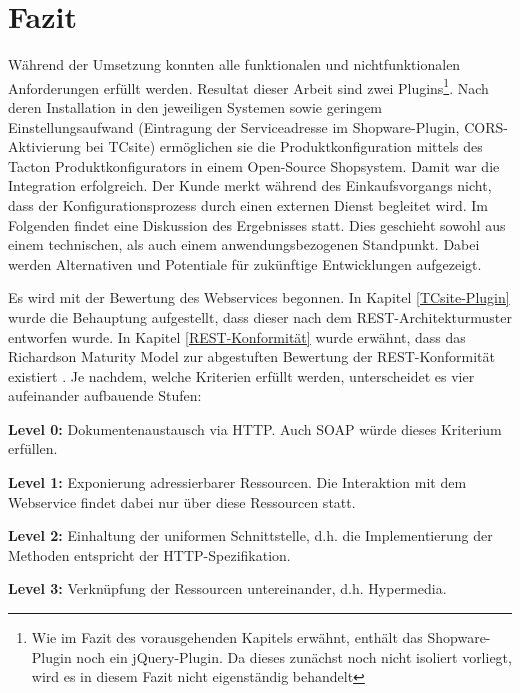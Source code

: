 \documentclass[11pt, a4paper, titlepage, listof=totoc, bibliography=totoc, index=totoc, twoside, openright, headings=normal]{scrreprt}
\begin{document}
\chapter{Fazit}
\label{Fazit}
Während der Umsetzung konnten alle funktionalen und nichtfunktionalen Anforderungen erfüllt werden. Resultat dieser Arbeit sind zwei Plugins\footnote{Wie im Fazit des vorausgehenden Kapitels erwähnt, enthält das Shopware-Plugin noch ein jQuery-Plugin. Da dieses zunächst noch nicht isoliert vorliegt, wird es in diesem Fazit nicht eigenständig behandelt}. Nach deren Installation in den jeweiligen Systemen sowie geringem Einstellungsaufwand (Eintragung der Serviceadresse im Shopware-Plugin, CORS-Aktivierung bei TCsite) ermöglichen sie die Produktkonfiguration mittels des Tacton Produktkonfigurators in einem Open-Source Shopsystem. Damit war die Integration erfolgreich. Der Kunde merkt während des Einkaufsvorgangs nicht, dass der Konfigurationsprozess durch einen externen Dienst begleitet wird. Im Folgenden findet eine Diskussion des Ergebnisses statt. Dies geschieht sowohl aus einem technischen, als auch einem anwendungsbezogenen Standpunkt. Dabei werden Alternativen und Potentiale für zukünftige Entwicklungen aufgezeigt.

Es wird mit der Bewertung des Webservices begonnen. In Kapitel \ref{TCsite-Plugin} wurde die Behauptung aufgestellt, dass dieser nach dem REST-Architekturmuster entworfen wurde. In Kapitel \ref{REST-Konformität} wurde erwähnt, dass das \glqq Richardson Maturity Model\grqq{} zur abgestuften Bewertung der REST-Konformität existiert \citep{wilde11}. Je nachdem, welche Kriterien erfüllt werden, unterscheidet es vier aufeinander aufbauende Stufen:
\begin{compactitem}
\item\textbf{Level 0:} Dokumentenaustausch via HTTP. Auch SOAP würde dieses Kriterium erfüllen.
\item\textbf{Level 1:} Exponierung adressierbarer Ressourcen. Die Interaktion mit dem Webservice findet dabei nur über diese Ressourcen statt.
\item\textbf{Level 2:} Einhaltung der uniformen Schnittstelle, d.h. die Implementierung der Methoden entspricht der HTTP-Spezifikation.
\item\textbf{Level 3:} Verknüpfung der Ressourcen untereinander, d.h. Hypermedia.
\end{compactitem}
\end{document}
